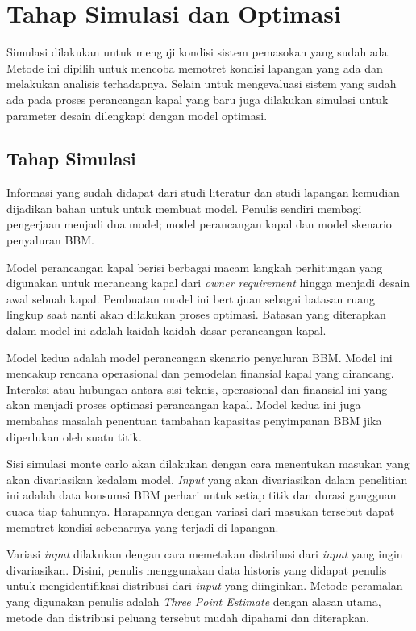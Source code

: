 \section{Tahap Simulasi dan Optimasi}
\label{sec:tahap-simulasi-optimasi}

Simulasi dilakukan untuk menguji kondisi sistem pemasokan yang sudah ada. Metode ini dipilih untuk mencoba memotret kondisi lapangan yang ada dan melakukan analisis terhadapnya. Selain untuk mengevaluasi sistem yang sudah ada pada proses perancangan kapal yang baru juga dilakukan simulasi untuk parameter desain dilengkapi dengan model optimasi.

\subsection{Tahap Simulasi}
\label{subsec:tahap-simulasi}

    Informasi yang sudah didapat dari studi literatur dan studi lapangan kemudian dijadikan bahan untuk untuk membuat model. Penulis sendiri membagi pengerjaan menjadi dua model; model perancangan kapal dan model skenario penyaluran BBM.

    Model perancangan kapal berisi berbagai macam langkah perhitungan yang digunakan untuk merancang kapal dari \emph{owner requirement} hingga menjadi desain awal sebuah kapal. Pembuatan model ini bertujuan sebagai batasan ruang lingkup saat nanti akan dilakukan proses optimasi. Batasan yang diterapkan dalam model ini adalah kaidah-kaidah dasar perancangan kapal.

    Model kedua adalah model perancangan skenario penyaluran BBM. Model ini mencakup rencana operasional dan pemodelan finansial kapal yang dirancang. Interaksi atau hubungan antara sisi teknis, operasional dan finansial ini yang akan menjadi proses optimasi perancangan kapal. Model kedua ini juga membahas masalah penentuan tambahan kapasitas penyimpanan BBM jika diperlukan oleh suatu titik.

    Sisi simulasi monte carlo akan dilakukan dengan cara menentukan masukan yang akan divariasikan kedalam model. \emph{Input} yang akan divariasikan dalam penelitian ini adalah data konsumsi BBM perhari untuk setiap titik dan durasi gangguan cuaca tiap tahunnya. Harapannya dengan variasi dari masukan tersebut dapat memotret kondisi sebenarnya yang terjadi di lapangan.

    Variasi \emph{input} dilakukan dengan cara memetakan distribusi dari \emph{input} yang ingin divariasikan. Disini, penulis menggunakan data historis yang didapat penulis untuk mengidentifikasi distribusi dari \emph{input} yang diinginkan. Metode peramalan yang digunakan penulis adalah \emph{Three Point Estimate} dengan alasan utama, metode dan distribusi peluang tersebut mudah dipahami dan diterapkan.

